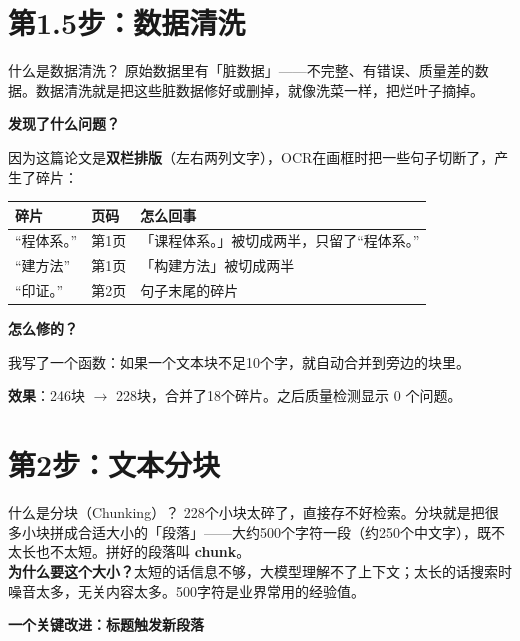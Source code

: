 \documentclass[12pt,a4paper,landscape]{article}
\begin{document}
\section{第1.5步：数据清洗}

\begin{termbox}{什么是数据清洗？}
原始数据里有「脏数据」——不完整、有错误、质量差的数据。数据清洗就是把这些脏数据修好或删掉，就像洗菜一样，把烂叶子摘掉。
\end{termbox}

\textbf{发现了什么问题？}

因为这篇论文是\textbf{双栏排版}（左右两列文字），OCR在画框时把一些句子切断了，产生了碎片：

\begin{center}
\begin{tabular}{lll}
\toprule
\textbf{碎片} & \textbf{页码} & \textbf{怎么回事} \\
\midrule
``程体系。'' & 第1页 & 「课程体系。」被切成两半，只留了``程体系。'' \\
``建方法''   & 第1页 & 「构建方法」被切成两半 \\
``印证。''   & 第2页 & 句子末尾的碎片 \\
\bottomrule
\end{tabular}
\end{center}

\textbf{怎么修的？}

我写了一个函数：如果一个文本块不足10个字，就自动合并到旁边的块里。

\textbf{效果}：246块 $\to$ 228块，合并了18个碎片。之后质量检测显示 0 个问题。

\section{第2步：文本分块}

\begin{termbox}{什么是分块（Chunking）？}
228个小块太碎了，直接存不好检索。分块就是把很多小块拼成合适大小的「段落」——大约500个字符一段（约250个中文字），既不太长也不太短。拼好的段落叫 \textbf{chunk}。\\[2pt]
\textbf{为什么要这个大小？}太短的话信息不够，大模型理解不了上下文；太长的话搜索时噪音太多，无关内容太多。500字符是业界常用的经验值。
\end{termbox}

\textbf{一个关键改进：标题触发新段落}
\end{document}
